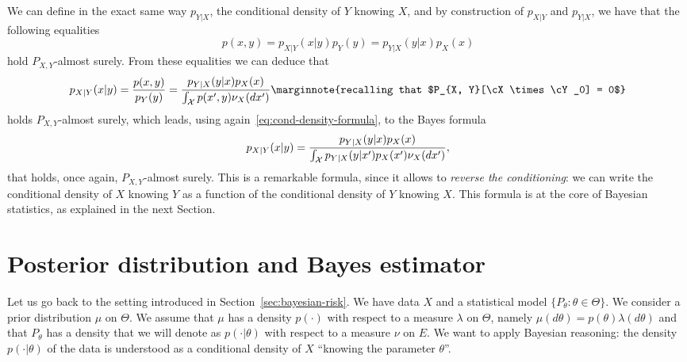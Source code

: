 We can define in the exact same way $p_{Y | X}$, the conditional density of $Y$ knowing $X$, and by construction of $p_{X | Y}$ and $p_{Y | X}$, we have that the following equalities
\begin{equation}
	\label{eq:cond-density-formula}
	p(x, y) = p_{X | Y}(x | y) p_Y(y) = p_{Y | X}(y | x) p_X(x)
\end{equation}
hold $P_{X, Y}$-almost surely.
From these equalities we can deduce that
\begin{equation*}
	p_{X | Y}(x | y) = \frac{p(x, y)}{p_Y(y)} = \frac{p_{Y | X}(y | x) p_X(x)}{\int_{\cX} p(x', y) \nu_X(dx')}
	\marginnote{recalling that $P_{X, Y}[\cX \times \cY_0] = 0$}
\end{equation*}
holds $P_{X, Y}$-almost surely, which leads, using again~\eqref{eq:cond-density-formula}, to the Bayes formula
\begin{equation}
	\label{eq:bayes-formula-conditional-densities}
	p_{X | Y}(x | y) = \frac{p_{Y | X}(y | x) p_X(x)}{\int_{\operatorname{{\mathcal X}}} p_{Y | X}(y | x') p_X(x') \nu_X(dx')},
\end{equation}
that holds, once again, $P_{X, Y}$-almost surely.
This is a remarkable formula, since it allows to \emph{reverse the conditioning}: we can write the conditional density of $X$ knowing $Y$ as a function of the conditional density of $Y$ knowing $X$.
This formula is at the core of Bayesian statistics, as explained in the next Section.


\section{Posterior distribution and Bayes estimator} %
\label{sec:posterior_distribution_and_bayes_estimator}

Let us go back to the setting introduced in Section~\ref{sec:bayesian-risk}.
We have data $X$ and a statistical model $\{ P_\theta : \theta \in \Theta \}$.
We consider a prior distribution $\mu$ on $\Theta$.
We assume that $\mu$ has a density $p(\cdot)$ with respect to a measure $\lambda$ on $\Theta$, namely $\mu(d \theta) = p(\theta) \lambda(d \theta)$ and that $P_\theta$ has a density that we will denote as $p(\cdot | \theta)$ with respect to a measure $\nu$ on $E$.
We want to apply Bayesian reasoning: the density $p(\cdot | \theta)$ of the data is understood as a  conditional density of $X$ ``knowing the parameter $\theta$''.



